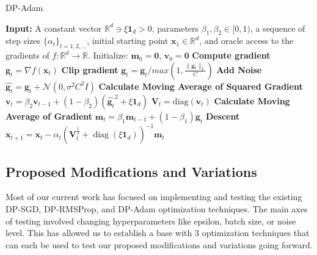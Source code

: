 \begin{algorithm}
    \caption{DP-Adam}
    \label{alg:adam}
    \begin{algorithmic}[1]
        \State \textbf{Input:} A constant vector $\mathbb{R}^d \ni \xi \mathbf{1}_d > 0$, parameters $\beta_1, \beta_2 \in [0, 1)$, a sequence of step sizes $\{\alpha_t\}_{t=1,2,\dots}$, initial starting point $\mathbf{x}_1 \in \mathbb{R}^d$, and oracle access to the gradients of $f : \mathbb{R}^d \to \mathbb{R}$.
            \State Initialize: $\mathbf{m}_0 = \mathbf{0}$, $\mathbf{v}_0 = \mathbf{0}$
            \State \textbf{Compute gradient}
                \State $\mathbf{g}_t = \nabla f(\mathbf{x}_t)$
                \State \textbf{Clip gradient}
                \State $\mathbf{g}_t = \mathbf{g}_t/max(1, \frac{\lVert \mathbf{g}_t \rVert_{2} }{C})$
                \State \textbf{Add Noise}
                \State $\hat{\mathbf{g}_t} = \mathbf{g}_t + \mathcal{N}(0,\sigma^{2}C^{2}I)$
                \State \textbf{Calculate Moving Average of Squared Gradient}
                \State $\mathbf{v}_t = \beta_2 \mathbf{v}_{t-1} + (1 - \beta_2)(\hat{\mathbf{g}_t}^2 + \xi \mathbf{1}_d)$
                \State $\mathbf{V}_t = \text{diag}(\mathbf{v}_t)$
                \State \textbf{Calculate Moving Average of Gradient}
                \State $\mathbf{m}_t = \beta_1 \mathbf{m}_{t-1} + (1 - \beta_1) \hat{\mathbf{g}_t}$
                \State \textbf{Descent}
                \State $\mathbf{x}_{t+1} = \mathbf{x}_t - \alpha_t \left( \mathbf{V}_t^{\frac{1}{2}} + \operatorname{diag}(\xi \mathbf{1}_d) \right)^{-1} \mathbf{m}_t$

            \EndFor
        \EndFunction
    \end{algorithmic}
\end{algorithm}

\subsection{Proposed Modifications and Variations}\label{subsec:modification-and-variations}
Most of our current work has focused on implementing and testing the existing DP-SGD, DP-RMSProp, and DP-Adam optimization techniques. The main axes
of testing involved changing hyperparameters like epsilon, batch size, or noise level. This has allowed us to establish a base with 3 optimization techniques
that can each be used to test our proposed modifications and variations going forward.

